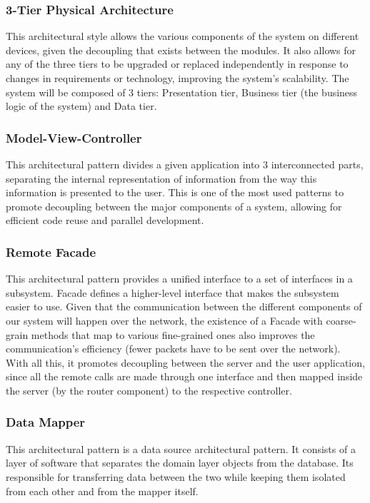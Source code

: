 \documentclass[12pt]{article}
\begin{document}
\subsubsection{3-Tier Physical Architecture} This architectural style allows the various components of the system on different devices, given the decoupling that exists between the modules. It also allows for any of the three tiers to be upgraded or replaced independently in response to changes in requirements or technology, improving the system's scalability. The system will be composed of 3 tiers: Presentation tier, Business tier (the business logic of the system) and Data tier.

\subsubsection{Model-View-Controller} This architectural pattern divides a given application into 3 interconnected parts, separating the internal representation of information from the way this information is presented to the user. This is one of the most used patterns to promote decoupling between the major components of a system, allowing for efficient code reuse and parallel development.

\subsubsection{Remote Facade} This architectural pattern provides a unified interface to a set of interfaces in a subsystem. Facade defines a higher-level interface that makes the subsystem easier to use. Given that the communication between the different components of our system will happen over the network, the existence of a Facade with coarse-grain methods that map to various fine-grained ones also improves the communication's efficiency (fewer packets have to be sent over the network). With all this, it promotes decoupling between the server and the user application, since all the remote calls are made through one interface and then mapped inside the server (by the router component) to the respective controller.

\subsubsection{Data Mapper} This architectural pattern is a data source architectural pattern. It consists of a layer of software that separates the domain layer objects from the database. Its responsible for transferring data between the two while keeping them isolated from each other and from the mapper itself.
\end{document}
